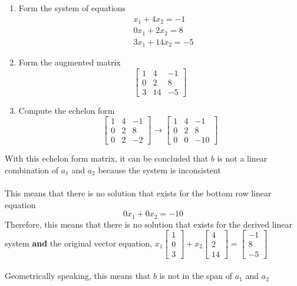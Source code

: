 \begin{enumerate}
  \item Form the system of equations
    \[
      \begin{aligned}
        &x_1 + 4x_2 = -1 \\
        &0x_1 + 2x_2 = 8 \\
        &3x_1 + 14x_2 = -5
      \end{aligned}
    \]
  \item Form the augmented matrix
    \[ \left[
      \begin{array}{cc|c}
        1 & 4 & -1 \\
        0 & 2 & 8 \\
        3 & 14 & -5
      \end{array}
    \right] \]
  \item Compute the echelon form
    \[ \left[
      \begin{array}{cc|c}
        1 & 4 & -1 \\
        0 & 2 & 8 \\
        0 & 2 & -2
      \end{array}
    \right] \rightarrow \left[ 
      \begin{array}{cc|c}
        1 & 4 & -1 \\
        0 & 2 & 8 \\
        0 & 0 & -10
      \end{array} \right]
    \]
\end{enumerate}
With this echelon form matrix, it can be concluded that $b$ is not a linear
combination of $a_1$ and $a_2$ because the system is inconsistent \\\\
This means that there is no solution that exists for the bottom row linear equation
\[
  0x_1 + 0x_2 = -10
\]
Therefore, this means that there is no solution that exists for the 
derived linear system
\textbf{and} the original vector equation,  
  $x_1\begin{bmatrix}
    1 \\ 0 \\ 3
  \end{bmatrix} + x_2\begin{bmatrix}
    4 \\ 2 \\ 14
  \end{bmatrix} = \begin{bmatrix}
    -1 \\ 8 \\ -5
  \end{bmatrix}$ \\\\
Geometrically speaking, this means that $b$ is not in the span of $a_1$ and $a_2$
